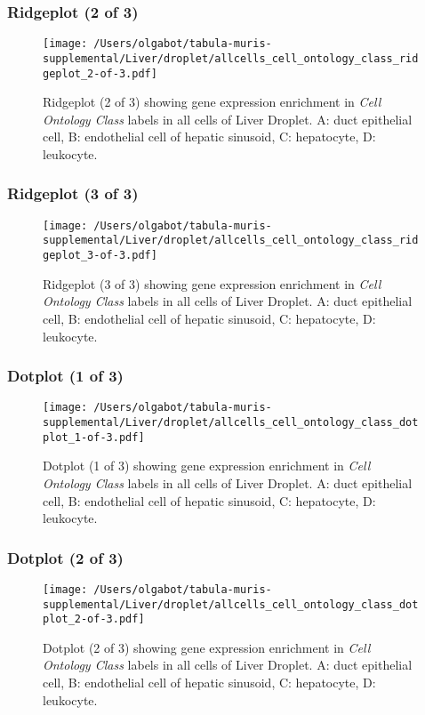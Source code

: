 \clearpage

\subsubsection{Ridgeplot (2 of 3)}
\begin{figure}[h]
\centering
\texttt{[image: /Users/olgabot/tabula-muris-supplemental/Liver/droplet/allcells\_cell\_ontology\_class\_ridgeplot\_2-of-3.pdf]}

\caption{ Ridgeplot (2 of 3)  showing gene expression enrichment in \emph{Cell Ontology Class} labels in all cells of Liver Droplet. A: duct epithelial cell, B: endothelial cell of hepatic sinusoid, C: hepatocyte, D: leukocyte.}
\end{figure}


\clearpage

\subsubsection{Ridgeplot (3 of 3)}
\begin{figure}[h]
\centering
\texttt{[image: /Users/olgabot/tabula-muris-supplemental/Liver/droplet/allcells\_cell\_ontology\_class\_ridgeplot\_3-of-3.pdf]}

\caption{ Ridgeplot (3 of 3)  showing gene expression enrichment in \emph{Cell Ontology Class} labels in all cells of Liver Droplet. A: duct epithelial cell, B: endothelial cell of hepatic sinusoid, C: hepatocyte, D: leukocyte.}
\end{figure}


\clearpage

\subsubsection{Dotplot (1 of 3)}
\begin{figure}[h]
\centering
\texttt{[image: /Users/olgabot/tabula-muris-supplemental/Liver/droplet/allcells\_cell\_ontology\_class\_dotplot\_1-of-3.pdf]}

\caption{ Dotplot (1 of 3)  showing gene expression enrichment in \emph{Cell Ontology Class} labels in all cells of Liver Droplet. A: duct epithelial cell, B: endothelial cell of hepatic sinusoid, C: hepatocyte, D: leukocyte.}
\end{figure}


\clearpage

\subsubsection{Dotplot (2 of 3)}
\begin{figure}[h]
\centering
\texttt{[image: /Users/olgabot/tabula-muris-supplemental/Liver/droplet/allcells\_cell\_ontology\_class\_dotplot\_2-of-3.pdf]}

\caption{ Dotplot (2 of 3)  showing gene expression enrichment in \emph{Cell Ontology Class} labels in all cells of Liver Droplet. A: duct epithelial cell, B: endothelial cell of hepatic sinusoid, C: hepatocyte, D: leukocyte.}
\end{figure}


